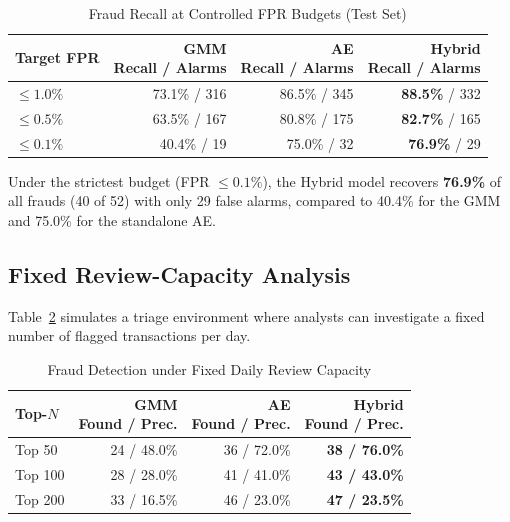 \documentclass[conference,10pt]{IEEEtran}
\begin{document}
\begin{table}[htbp]
\caption{Fraud Recall at Controlled FPR Budgets (Test Set)}
\label{tab:fpr}
\centering
\small
\begin{tabular}{@{}lrrr@{}}
\toprule
Target FPR & \makecell{GMM\\Recall / Alarms}
           & \makecell{AE\\Recall / Alarms}
           & \makecell{Hybrid\\Recall / Alarms} \\
\midrule
$\le 1.0\%$ & 73.1\% / 316 & 86.5\% / 345 & \textbf{88.5\%} / 332 \\
$\le 0.5\%$ & 63.5\% / 167 & 80.8\% / 175 & \textbf{82.7\%} / 165 \\
$\le 0.1\%$ & 40.4\% / 19  & 75.0\% / 32  & \textbf{76.9\%} / 29  \\
\bottomrule
\end{tabular}
\end{table}

Under the strictest budget (FPR $\le 0.1\%$), the Hybrid model recovers
\textbf{76.9\%} of all frauds (40 of 52) with only 29 false alarms, compared
to 40.4\% for the GMM and 75.0\% for the standalone AE.

\subsection{Fixed Review-Capacity Analysis}
Table~\ref{tab:review} simulates a triage environment where analysts can
investigate a fixed number of flagged transactions per day.

\begin{table}[htbp]
\caption{Fraud Detection under Fixed Daily Review Capacity}
\label{tab:review}
\centering
\small
\begin{tabular}{@{}lrrr@{}}
\toprule
Top-$N$ & \makecell{GMM\\Found / Prec.}
        & \makecell{AE\\Found / Prec.}
        & \makecell{Hybrid\\Found / Prec.} \\
\midrule
Top 50  & 24 / 48.0\% & 36 / 72.0\% & \textbf{38 / 76.0\%} \\
Top 100 & 28 / 28.0\% & 41 / 41.0\% & \textbf{43 / 43.0\%} \\
Top 200 & 33 / 16.5\% & 46 / 23.0\% & \textbf{47 / 23.5\%} \\
\bottomrule
\end{tabular}
\end{table}
\end{document}
